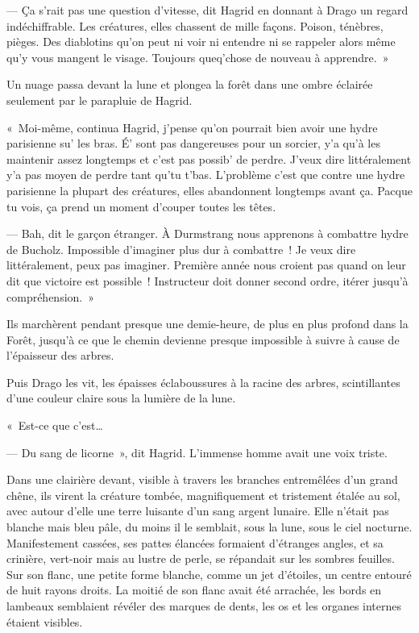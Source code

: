 --- Ça s'rait pas une question d'vitesse, dit Hagrid en donnant à Drago un regard indéchiffrable. Les créatures, elles chassent de mille façons. Poison, ténèbres, pièges. Des diablotins qu'on peut ni voir ni entendre ni se rappeler alors même qu'y vous mangent le visage. Toujours queq'chose de nouveau à apprendre.~»

Un nuage passa devant la lune et plongea la forêt dans une ombre éclairée seulement par le parapluie de Hagrid.

«~Moi-même, continua Hagrid, j'pense qu'on pourrait bien avoir une hydre parisienne su' les bras. É' sont pas dangereuses pour un sorcier, y'a qu'à les maintenir assez longtemps et c'est pas possib' de perdre. J'veux dire littéralement y'a pas moyen de perdre tant qu'tu t'bas. L'problème c'est que contre une hydre parisienne la plupart des créatures, elles abandonnent longtemps avant ça. Pacque tu vois, ça prend un moment d'couper toutes les têtes.

--- Bah, dit le garçon étranger. À Durmstrang nous apprenons à combattre hydre de Bucholz. Impossible d'imaginer plus dur à combattre~! Je veux dire littéralement, peux pas imaginer. Première année nous croient pas quand on leur dit que victoire est possible~! Instructeur doit donner second ordre, itérer jusqu'à compréhension.~»

Ils marchèrent pendant presque une demie-heure, de plus en plus profond dans la Forêt, jusqu'à ce que le chemin devienne presque impossible à suivre à cause de l'épaisseur des arbres.

Puis Drago les vit, les épaisses éclaboussures à la racine des arbres, scintillantes d'une couleur claire sous la lumière de la lune.

«~Est-ce que c'est…

--- Du sang de licorne~», dit Hagrid. L'immense homme avait une voix triste.

Dans une clairière devant, visible à travers les branches entremêlées d'un grand chêne, ils virent la créature tombée, magnifiquement et tristement étalée au sol, avec autour d'elle une terre luisante d'un sang argent lunaire. Elle n'était pas blanche mais bleu pâle, du moins il le semblait, sous la lune, sous le ciel nocturne. Manifestement cassées, ses pattes élancées formaient d'étranges angles, et sa crinière, vert-noir mais au lustre de perle, se répandait sur les sombres feuilles. Sur son flanc, une petite forme blanche, comme un jet d'étoiles, un centre entouré de huit rayons droits. La moitié de son flanc avait été arrachée, les bords en lambeaux semblaient révéler des marques de dents, les os et les organes internes étaient visibles.

